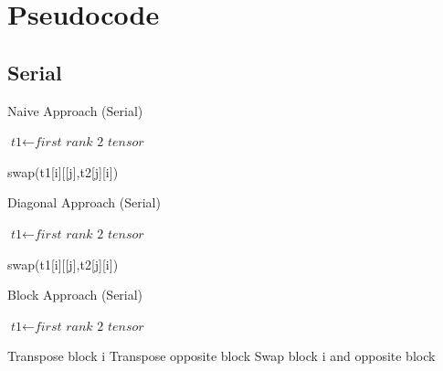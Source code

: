 \documentclass[journal,10pt]{IEEEtran}
\begin{document}
\clearpage
\onecolumn
\printbibliography

\clearpage

\onecolumn
\section*{Pseudocode}
\subsection*{Serial}

\begin{algorithm}
\caption{Naive Approach (Serial)}\label{euclid}
\begin{algorithmic}[1]
\State $\textit{t1} \gets \textit{first rank 2 tensor}$


\State swap(t1[i][[j],t2[j][i])
\EndFor
\EndFor



\EndProcedure
\end{algorithmic}
\end{algorithm}


\begin{algorithm}
\caption{Diagonal Approach (Serial)}\label{euclid}
\begin{algorithmic}[1]
\State $\textit{t1} \gets \textit{first rank 2 tensor}$


\State swap(t1[i][[j],t2[j][i])
\EndFor
\EndFor



\EndProcedure
\end{algorithmic}
\end{algorithm}


\begin{algorithm}
\caption{Block Approach (Serial)}\label{euclid}
\begin{algorithmic}[1]
\State $\textit{t1} \gets \textit{first rank 2 tensor}$


\State Transpose block i
\State Transpose opposite block
\State Swap block i and opposite block
\EndFor



\EndProcedure
\end{algorithmic}
\end{algorithm}
\end{document}
